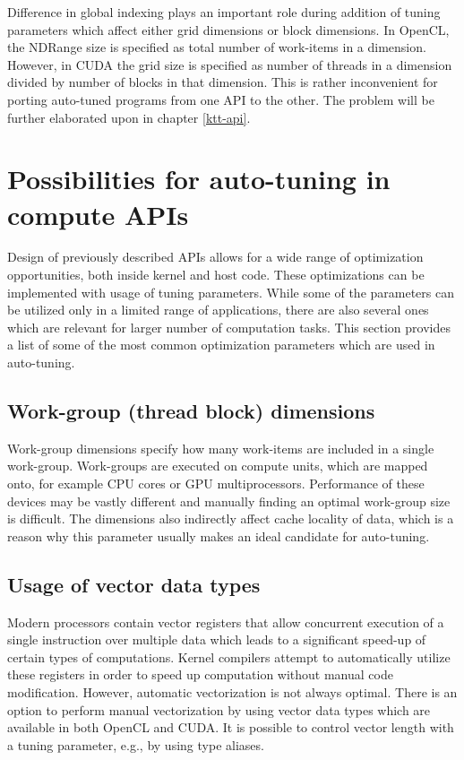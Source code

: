 \documentclass
[
    digital, %
    oneside, %
    table, %
    nolof, %
    nolot, %
    nocover %
]{fithesis3}
\begin{document}
Difference in global indexing plays an important role during addition of tuning parameters which affect either grid dimensions or block dimensions.
In OpenCL, the NDRange size is specified as total number of work-items in a dimension. However, in CUDA the grid size is specified as number of threads
in a dimension divided by number of blocks in that dimension. This is rather inconvenient for porting auto-tuned programs from one API to the other.
The problem will be further elaborated upon in chapter \ref{ktt-api}.

\section{Possibilities for auto-tuning in compute APIs}
Design of previously described APIs allows for a wide range of optimization opportunities, both inside kernel and host code. These optimizations can
be implemented with usage of tuning parameters. While some of the parameters can be utilized only in a limited range of applications, there are also
several ones which are relevant for larger number of computation tasks. This section provides a list of some of the most common optimization parameters
which are used in auto-tuning.

\subsection{Work-group (thread block) dimensions}
Work-group dimensions specify how many work-items are included in a single work-group. Work-groups are executed on compute units, which are mapped
onto, for example CPU cores or GPU multiprocessors. Performance of these devices may be vastly different and manually finding an optimal work-group
size is difficult. The dimensions also indirectly affect cache locality of data, which is a reason why this parameter usually makes an ideal candidate
for auto-tuning.

\subsection{Usage of vector data types}
Modern processors contain vector registers that allow concurrent execution of a single instruction over multiple data which leads to a significant
speed-up of certain types of computations. Kernel compilers attempt to automatically utilize these registers in order to speed up computation without
manual code modification. However, automatic vectorization is not always optimal. There is an option to perform manual vectorization by using vector
data types which are available in both OpenCL and CUDA. It is possible to control vector length with a tuning parameter, e.g., by using type aliases.
\end{document}
